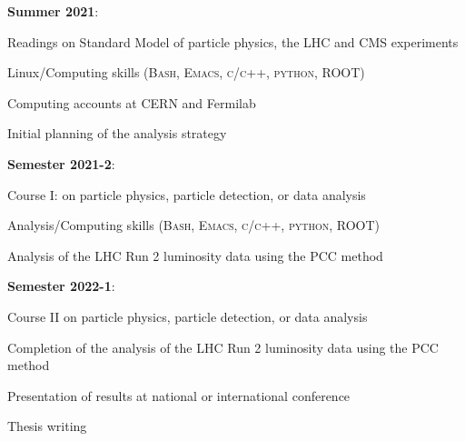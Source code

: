 \documentclass[final,12pt]{article}
\newcommand{\SubItem}[1]{ {\setlength\itemindent{15pt} \item[-] #1} }
\begin{document}
\begin{itemize}

\item {\bf Summer 2021}:
  \SubItem{ Readings on Standard Model of particle physics,  the LHC and CMS experiments}
  \SubItem{ Linux/Computing skills (\textsc{Bash, Emacs, c/c++, python, ROOT})}
  \SubItem{ Computing accounts at CERN and Fermilab}
  \SubItem{ Initial planning of the analysis strategy}

\item {\bf Semester 2021-2}:
  \SubItem{ Course I: on particle physics, particle detection, or data analysis}
  \SubItem{ Analysis/Computing skills (\textsc{Bash, Emacs, c/c++, python, ROOT})}
  \SubItem{ Analysis of the LHC Run 2 luminosity data using the PCC method}

\item {\bf Semester 2022-1}:
  \SubItem{ Course II on particle physics, particle detection, or  data analysis}
  \SubItem{ Completion of the analysis of the LHC Run 2 luminosity data using the PCC method}
  \SubItem{ Presentation of results at national or international conference}
  \SubItem{ Thesis writing}

  
\end{itemize}


\onehalfspacing


\end{document}
